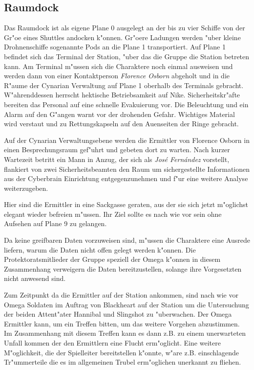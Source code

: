 \subsection{Raumdock}
Das Raumdock ist als eigene Plane 0 ausgelegt an der bis zu vier Schiffe von der Gr"o\3e eines Shuttles andocken k"onnen. Gr"o\3ere Ladungen werden "uber kleine Drohnenschiffe sogenannte Pods an die Plane 1 transportiert. Auf Plane 1 befindet sich das Terminal der Station, "uber das die Gruppe die Station betreten kann. Am Terminal m"ussen sich die Charaktere noch einmal ausweisen und werden dann von einer Kontaktperson \emph{Florence Osborn} abgeholt und in die R"aume der Cynarian Verwaltung auf Plane 1 oberhalb des Terminals gebracht. W"ahrenddessen herrscht hektische Betriebsamkeit auf Nike. Sicherheitskr"afte bereiten das Personal auf eine schnelle Evakuierung vor. Die Beleuchtung und ein Alarm auf den G"angen warnt vor der drohenden Gefahr. Wichtiges Material wird verstaut und zu Rettungskapseln auf den Au\3enseiten der Ringe gebracht.

Auf der Cynarian Verwaltungsebene werden die Ermittler von Florence Osborn in einen Besprechungsraum gef"uhrt und gebeten dort zu warten. Nach kurzer Wartezeit betritt ein Mann in Anzug, der sich als \emph{Jos\'e Fern\'andez} vorstellt, flankiert von zwei Sicherheitsbeamten den Raum um sichergestellte Informationen aus der Cyberbrain Einrichtung entgegenzunehmen und f"ur eine weitere Analyse weiterzugeben. 

\begin{remarks}
	Hier sind die Ermittler in eine Sackgasse geraten, aus der sie sich jetzt m"oglichst elegant wieder befreien m"ussen. Ihr Ziel sollte es nach wie vor sein ohne Aufsehen auf Plane 9 zu gelangen. 

	Da keine greifbaren Daten vorzuweisen sind, m"ussen die Charaktere eine Ausrede liefern, warum die Daten nicht offen gelegt werden k"onnen. Die Protektoratsmitlieder der Gruppe speziell der Omega k"onnen in diesem Zusammenhang verweigern die Daten bereitzustellen, solange ihre Vorgesetzten nicht anwesend sind.

	Zum Zeitpunkt da die Ermittler auf der Station ankommen, sind nach wie vor Omega Soldaten im Auftrag von Blackheart auf der Station um die Untersuchung der beiden Attent"ater Hannibal und Slingshot zu "uberwachen. Der Omega Ermittler kann, um ein Treffen bitten, um das weitere Vorgehen abzustimmen. Im Zusammenhang mit diesem Treffen kann es dann z.B. zu einem unerwarteten Unfall kommen der den Ermittlern eine Flucht erm"oglicht. Eine weitere M"oglichkeit, die der Spielleiter bereitstellen k"onnte, w"are z.B. einschlagende Tr"ummerteile die es im allgemeinen Trubel erm"oglichen unerkannt zu fliehen.
\end{remarks}
